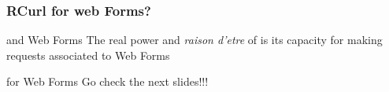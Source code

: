 \documentclass{beamer}\usepackage[]{graphicx}\usepackage[]{color}
\begin{document}

\begin{frame}
\frametitle{RCurl for web Forms?}

\begin{block}{ and Web Forms}
The real power and \textit{raison d'etre} of  is its capacity for making requests associated to Web Forms
\end{block}

\begin{block}{ for Web Forms}
Go check the next slides!!!
\end{block}

\end{frame}

\end{document}
